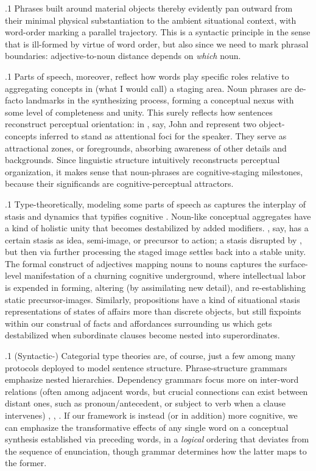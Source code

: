 \documentclass[11pt, twocolumn]{article}
\begin{document}
\p.1{%
\:\+Phrases built around material objects thereby evidently
pan outward from their minimal physical substantiation
to the ambient situational context, with word-order
marking a parallel trajectory. \> This is a syntactic
principle in the sense that  is ill-formed
by virtue of word order, but also since we
need to mark phrasal boundaries: adjective-to-noun distance
depends on \textit{which} noun.\<\;
} %

\p.1{%
\:\+Parts of speech, moreover, reflect how words play
specific roles relative to aggregating concepts in
(what I would call) a  staging 
area. \> Noun phrases are de-facto landmarks in the synthesizing
process, forming a conceptual nexus with some
level of completeness and unity. \> This surely reflects
how sentences reconstruct perceptual orientation:
in \jrefs{}, say, John and  represent two
object-concepts inferred to stand as
attentional foci for the speaker. \> They serve
as attractional zones, or foregrounds, absorbing
awareness of other details and backgrounds. \> Since linguistic structure
intuitively reconstructs perceptual organization,
it makes sense that noun-phrases are cognitive-staging
milestones, because their significands are cognitive-perceptual
attractors.\<\;
} %

\p.1{%
\:\+Type-theoretically, modeling some parts of speech as
 captures the
interplay of stasis and dynamics that typifies
cognitive . \> Noun-like conceptual
aggregates have a kind of holistic unity that becomes
destabilized by added modifiers. \> , say,
has a certain stasis as idea, semi-image, or
precursor to action; a stasis disrupted by , but
then via further processing the staged image settles
back into a stable unity. \> The formal construct
of adjectives mapping nouns to nouns captures the
surface-level manifestation of a churning cognitive
underground, \pgl{}where intellectual labor is expended in
forming, altering (by assimilating new detail), and
re-establishing static precursor-images. \> Similarly, propositions
have a kind of situational stasis \mdash{} representations of
states of affairs more than
discrete objects, but still fixpoints within
our construal of facts and affordances surrounding us \mdash{}
which gets destabilized when subordinate clauses become nested into
superordinates.\<\;
} %

\p.1{%
\:\+(Syntactic-) Categorial type theories are, of course, just a few among many protocols
deployed to model sentence structure. \> Phrase-structure grammars emphasize
nested hierarchies. \> Dependency grammars
focus more on inter-word relations (often among adjacent words, but crucial
connections can exist between distant ones, such as pronoun/antecedent,
or subject to verb when a clause intervenes)
, , 
. \> If our framework is instead 
(or in addition) more
cognitive, we can emphasize the transformative effects
of any single word on a conceptual synthesis established
via preceding words, in a \textit{logical} ordering that
deviates from the sequence of enunciation, though grammar
determines how the latter maps to the former.\<\;
} %
\end{document}
